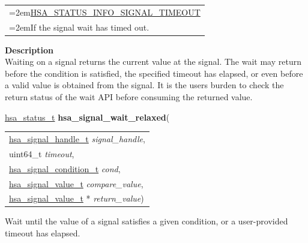 \documentclass[final]{book}
\newcommand{\hsaarg}[1]{\textit{#1}}
\begin{document}
\begin{appendices}
\begin{longtable}{@{}>{\hangindent=2em}p{\linewidth}}
\hyperlink{group--status-1ggad755322e7ff95456520e8abdbe90d225a96e987aac8207e7a0f92fb8a8d73b91e}{HSA_STATUS_INFO_SIGNAL_TIMEOUT}\\\hspace{2em}If the signal wait has timed out.
\end{longtable}
\vspace{-4mm}\noindent\textbf{Description}\\[1mm]
Waiting on a signal returns the current value at the signal. The wait may return before the condition is satisfied, the specified timeout has elapsed, or even before a valid value is obtained from the signal. It is the users burden to check the return status of the wait API before consuming the returned value. 


\noindent\begin{tcolorbox}[breakable,nobeforeafter,colframe=white,colback=lightgray,left=0mm]
\hyperlink{group--status-1gad755322e7ff95456520e8abdbe90d225}{hsa_status_t} \hypertarget{group--signals-1ga1277e58360af915f1b9fbe76739296e0}{\textbf{hsa_signal_wait_relaxed}}(
\vspace{-3.5mm}\begin{longtable}{@{}p{\textwidth}}
\hspace{1.7em}\hyperlink{group--signals-1ga6592c136d70853d855bc11d9efdbf534}{hsa_signal_handle_t} \hsaarg{signal_handle},\\
\hspace{1.7em}uint64_t \hsaarg{timeout},\\
\hspace{1.7em}\hyperlink{group--signals-1gab7190fcff48c6dbeded341389ed17c8d}{hsa_signal_condition_t} \hsaarg{cond},\\
\hspace{1.7em}\hyperlink{group--signals-1gafbee4e541abad1c32592796808a7fdb6}{hsa_signal_value_t} \hsaarg{compare_value},\\
\hspace{1.7em}\hyperlink{group--signals-1gafbee4e541abad1c32592796808a7fdb6}{hsa_signal_value_t} * \hsaarg{return_value})\end{longtable}

\end{tcolorbox}
Wait until the value of a signal satisfies a given condition, or a user-provided timeout has elapsed.


\end{appendices}
\end{document}
